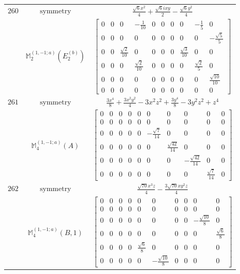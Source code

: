 \documentclass[fleqn,8pt,landscape]{jsarticle}
\begin{document}
\begin{longtable}{ccc}
$ 260 $ & $ \text{symmetry} $ & $ \frac{\sqrt{6} x^{2}}{4} + \frac{\sqrt{6} i x y}{2} - \frac{\sqrt{6} y^{2}}{4} $ \\
$  $ & $ \mathbb{M}_{2}^{(1,-1;a)}(E_{2}^{(b)}) $ & $ \begin{bmatrix} 0 & 0 & 0 & - \frac{1}{10} & 0 & 0 & 0 & 0 & - \frac{1}{5} & 0 \\ 0 & 0 & 0 & 0 & 0 & 0 & 0 & 0 & 0 & - \frac{\sqrt{5}}{5} \\ 0 & 0 & \frac{\sqrt{2}}{10} & 0 & 0 & 0 & 0 & \frac{\sqrt{3}}{10} & 0 & 0 \\ 0 & 0 & 0 & \frac{\sqrt{2}}{10} & 0 & 0 & 0 & 0 & \frac{\sqrt{2}}{5} & 0 \\ 0 & 0 & 0 & 0 & 0 & 0 & 0 & 0 & 0 & \frac{\sqrt{10}}{10} \\ 0 & 0 & 0 & 0 & 0 & 0 & 0 & 0 & 0 & 0 \end{bmatrix} $ \\ \hline
$ 261 $ & $ \text{symmetry} $ & $ \frac{3 x^{4}}{8} + \frac{3 x^{2} y^{2}}{4} - 3 x^{2} z^{2} + \frac{3 y^{4}}{8} - 3 y^{2} z^{2} + z^{4} $ \\
$  $ & $ \mathbb{M}_{4}^{(1,-1;a)}(A) $ & $ \begin{bmatrix} 0 & 0 & 0 & 0 & 0 & 0 & 0 & 0 & 0 & 0 \\ 0 & 0 & 0 & 0 & 0 & 0 & 0 & 0 & 0 & 0 \\ 0 & 0 & 0 & 0 & 0 & - \frac{\sqrt{7}}{14} & 0 & 0 & 0 & 0 \\ 0 & 0 & 0 & 0 & 0 & 0 & \frac{\sqrt{42}}{14} & 0 & 0 & 0 \\ 0 & 0 & 0 & 0 & 0 & 0 & 0 & - \frac{\sqrt{42}}{14} & 0 & 0 \\ 0 & 0 & 0 & 0 & 0 & 0 & 0 & 0 & \frac{\sqrt{7}}{14} & 0 \end{bmatrix} $ \\ \hline
$ 262 $ & $ \text{symmetry} $ & $ \frac{\sqrt{70} x^{3} z}{4} - \frac{3 \sqrt{70} x y^{2} z}{4} $ \\
$  $ & $ \mathbb{M}_{4}^{(1,-1;a)}(B,1) $ & $ \begin{bmatrix} 0 & 0 & 0 & 0 & 0 & 0 & 0 & 0 & 0 & 0 \\ 0 & 0 & 0 & 0 & 0 & 0 & 0 & 0 & 0 & 0 \\ 0 & 0 & 0 & 0 & 0 & 0 & 0 & 0 & - \frac{\sqrt{10}}{8} & 0 \\ 0 & 0 & 0 & 0 & 0 & 0 & 0 & 0 & 0 & \frac{\sqrt{6}}{8} \\ 0 & 0 & 0 & 0 & \frac{\sqrt{6}}{8} & 0 & 0 & 0 & 0 & 0 \\ 0 & 0 & 0 & 0 & 0 & - \frac{\sqrt{10}}{8} & 0 & 0 & 0 & 0 \end{bmatrix} $ \\ \hline

\end{longtable}
\end{document}
